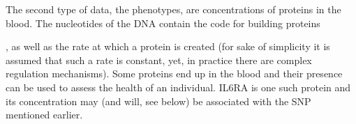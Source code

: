 The second type of data, the phenotypes, 
are concentrations of proteins in the blood. 
The nucleotides of the DNA contain the code for building proteins

,
as well as the rate at which a protein is created (for 
sake of simplicity it is assumed that such a rate is constant,
yet, in practice there are complex regulation mechanisms).
Some proteins end up in the blood and
their presence can be used to assess the health of an individual.
IL6RA is one such protein and its concentration may (and will, see below)
be associated with the SNP mentioned earlier.

